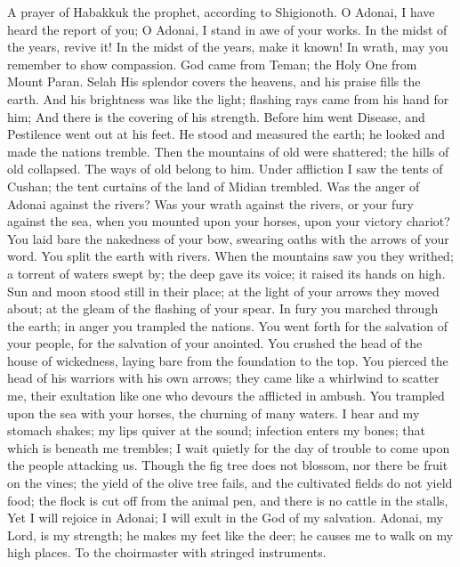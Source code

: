 \begin{biblechapter} %
 A prayer of Habakkuk the prophet, according to Shigionoth.
\verse O Adonai, I have heard the report of you; 
O Adonai, I stand in awe of your works. 
In the midst of the years, revive it! 
In the midst of the years, make it known! 
In wrath, may you remember to show compassion.
\verse God came from Teman; 
the Holy One from Mount Paran. Selah 
His splendor covers the heavens, 
and his praise fills the earth.
\verse And his brightness was like the light; 
flashing rays came from his hand for him; 
And there is the covering of his strength.
\verse Before him went Disease, 
and Pestilence went out at his feet.
\verse He stood and measured the earth; 
he looked and made the nations tremble. 
Then the mountains of old were shattered; 
the hills of old collapsed. 
The ways of old belong to him.
\verse Under affliction I saw the tents of Cushan; 
the tent curtains of the land of Midian trembled.
\verse Was the anger of Adonai against the rivers? 
Was your wrath against the rivers, 
or your fury against the sea, 
when you mounted upon your horses, 
upon your victory chariot?
\verse You laid bare the nakedness of your bow, 
swearing oaths with the arrows of your word. 
You split the earth with rivers.
\verse When the mountains saw you they writhed; 
a torrent of waters swept by; 
the deep gave its voice; 
it raised its hands on high.
\verse Sun and moon stood still in their place; 
at the light of your arrows they moved about; 
at the gleam of the flashing of your spear.
\verse In fury you marched through the earth; 
in anger you trampled the nations.
\verse You went forth for the salvation of your people, 
for the salvation of your anointed. 
You crushed the head of the house of wickedness, 
laying bare from the foundation to the top.
\verse You pierced the head of his warriors with his own arrows; 
they came like a whirlwind to scatter me, 
their exultation like one who devours the afflicted in ambush.
\verse You trampled upon the sea with your horses, 
the churning of many waters.
\verse I hear and my stomach shakes; 
my lips quiver at the sound; 
infection enters my bones; 
that which is beneath me trembles; 
I wait quietly for the day of trouble 
to come upon the people attacking us.
\verse Though the fig tree does not blossom, 
nor there be fruit on the vines; 
the yield of the olive tree fails, 
and the cultivated fields do not yield food; 
the flock is cut off from the animal pen, 
and there is no cattle in the stalls,
\verse Yet I will rejoice in Adonai; 
I will exult in the God of my salvation.
\verse Adonai, my Lord, is my strength; 
he makes my feet like the deer; 
he causes me to walk on my high places. 
To the choirmaster with stringed instruments.
\end{biblechapter}

